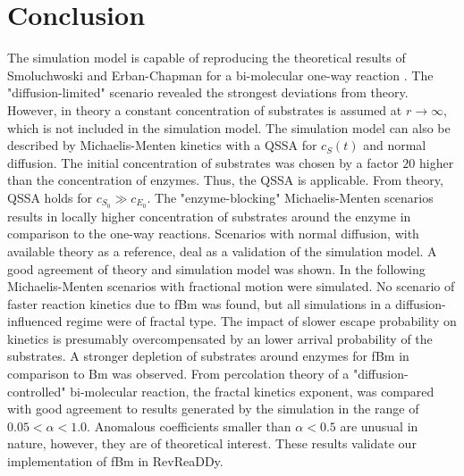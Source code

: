 \documentclass[
  a4paper,BCOR10mm,twoside,
  headsepline,footsepline,%
  fleqn,openbib
]{scrbook}
\begin{document}
\section{Conclusion}
The simulation model is capable of reproducing the theoretical results of Smoluchwoski and Erban-Chapman for a bi-molecular one-way reaction . The "diffusion-limited" scenario revealed the strongest deviations from theory.  However, in theory a constant concentration of substrates is assumed at $r\rightarrow \infty$, which is not included in the simulation model. The simulation model can also be described by Michaelis-Menten kinetics with a QSSA for $c_S(t)$ and normal diffusion. The initial concentration of substrates was chosen by a factor $20$ higher than the concentration of enzymes. Thus, the QSSA is applicable. From theory, QSSA holds for $c_{S_0}\gg c_{E_0}$. The "enzyme-blocking" Michaelis-Menten scenarios results in locally higher concentration of substrates around the enzyme in comparison to the one-way reactions. Scenarios with normal diffusion, with available theory as a reference, deal as a validation of the simulation model. A good agreement of theory and simulation model was shown. In the following Michaelis-Menten  scenarios with fractional motion were simulated. No scenario of faster reaction kinetics due to fBm was found, but all simulations in a diffusion-influenced regime were of fractal type. The impact of slower escape probability on kinetics is presumably overcompensated by an lower arrival probability of the substrates.  A stronger depletion of substrates around enzymes for fBm in comparison to Bm was observed. From percolation theory of a "diffusion-controlled" bi-molecular reaction, the fractal kinetics exponent, was compared with good agreement to results generated by the simulation in the range of $0.05<\alpha<1.0$. Anomalous coefficients smaller than $\alpha<0.5$ are unusual in nature, however, they are of theoretical interest. These results validate our implementation of fBm in RevReaDDy. 

\end{document}
